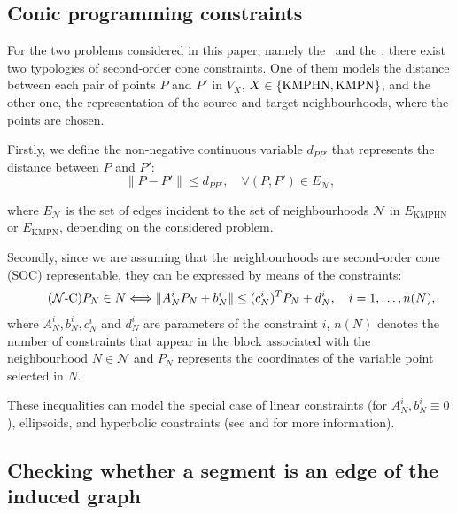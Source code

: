 \documentclass[a4paper,  review, authoryear, 1p.]{elsarticle}
\newcommand{\KMPHN}{{\sf{H-KMPHN}}}
\newcommand{\KMPN}{{\sf{H-KMPN}\xspace }}
\newcommand{\EN}{{E^{}_{\mathcal N}}}
\newcommand{\EKMPHN}{{E_{\text{KMPHN}}}}
\newcommand{\EKMPN}{{E_{\text{KMPN}}}}
\newcommand{\CV}[1]{{\color{blue}#1}}
\begin{document}
	\subsection{Conic programming constraints}\label{subsection:conic}
	For the two problems considered in this paper, namely the \KMPHN \ and the \KMPN, there exist two typologies of second-order cone constraints. One of them models the distance between each pair of points $P$ and $P'$ in $V_X$, $X\in\{\rm KMPHN, \rm KMPN\}$, and the other one, the representation of the source and target neighbourhoods, where the points are chosen.
	
	\newcommand{\dvar}[2]{d_{#1#2}}
	
	Firstly, we define the non-negative continuous variable $\dvar{P}{P'}$ that represents the distance between $P$ and $P'$:
	\begin{equation*}\tag{$d$-C}\label{eq:dC}
		\|P - P'\|\leq \dvar{P}{P'},\quad\forall (P,P')\in \EN,
	\end{equation*}
	
	\CV{where $\EN$ is the set of edges incident to the set of neighbourhoods $\mathcal N$ in $\EKMPHN$ or $\EKMPN$}, depending on the considered problem.
	
	Secondly, since we are assuming that the neighbourhoods are second-order cone (SOC) representable, they can be expressed by means of the constraints:
	\begin{equation*}\tag{$\mathcal N$-C}\label{eq:nC}
		P_N\in N \Longleftrightarrow
		\|A_N^i P_N + b_N^i\| \leq (c_N^i)^T P_N + d_N^i,\quad i=1,\ldots,n(N), \\
	\end{equation*}
	where $A_N^i, b_N^i, c_N^i$ and $d_N^i$ are parameters of the constraint $i$, $n(N)$ denotes the number of constraints that appear in the block associated with the neighbourhood $N\in \mathcal N$ \CV{and $P_N$ represents the coordinates of the variable point selected in $N$.} 
	
	These inequalities can model the special case of linear constraints (for $A_N^{i}, b_N^i\equiv 0$), ellipsoids, and hyperbolic constraints (see \citet{lobo1998} and \citet{boyd2004} for more information).
	
	\subsection{Checking whether a segment is an edge of the induced graph}
	
\end{document}
